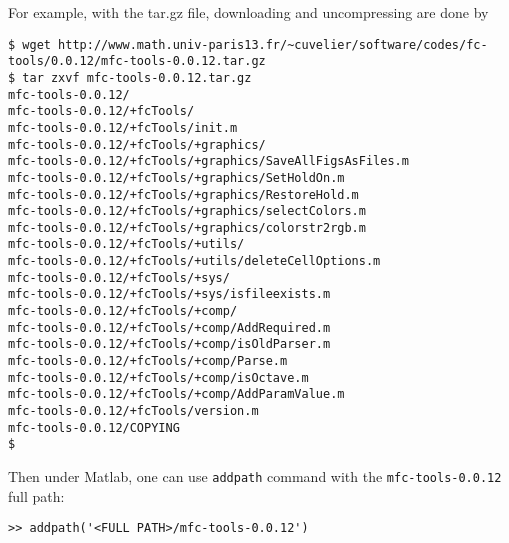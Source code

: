 For example, with the tar.gz file, downloading and uncompressing are done by 
\begin{verbatim}
$ wget http://www.math.univ-paris13.fr/~cuvelier/software/codes/fc-tools/0.0.12/mfc-tools-0.0.12.tar.gz
$ tar zxvf mfc-tools-0.0.12.tar.gz
mfc-tools-0.0.12/
mfc-tools-0.0.12/+fcTools/
mfc-tools-0.0.12/+fcTools/init.m
mfc-tools-0.0.12/+fcTools/+graphics/
mfc-tools-0.0.12/+fcTools/+graphics/SaveAllFigsAsFiles.m
mfc-tools-0.0.12/+fcTools/+graphics/SetHoldOn.m
mfc-tools-0.0.12/+fcTools/+graphics/RestoreHold.m
mfc-tools-0.0.12/+fcTools/+graphics/selectColors.m
mfc-tools-0.0.12/+fcTools/+graphics/colorstr2rgb.m
mfc-tools-0.0.12/+fcTools/+utils/
mfc-tools-0.0.12/+fcTools/+utils/deleteCellOptions.m
mfc-tools-0.0.12/+fcTools/+sys/
mfc-tools-0.0.12/+fcTools/+sys/isfileexists.m
mfc-tools-0.0.12/+fcTools/+comp/
mfc-tools-0.0.12/+fcTools/+comp/AddRequired.m
mfc-tools-0.0.12/+fcTools/+comp/isOldParser.m
mfc-tools-0.0.12/+fcTools/+comp/Parse.m
mfc-tools-0.0.12/+fcTools/+comp/isOctave.m
mfc-tools-0.0.12/+fcTools/+comp/AddParamValue.m
mfc-tools-0.0.12/+fcTools/version.m
mfc-tools-0.0.12/COPYING
$
\end{verbatim}
Then under Matlab, one can use \texttt{addpath} command with the \texttt{mfc-tools-0.0.12} full path:
\begin{verbatim}
>> addpath('<FULL PATH>/mfc-tools-0.0.12')
\end{verbatim}
 






